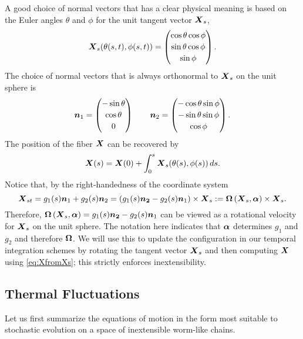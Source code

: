 A good choice of normal vectors that has a clear physical meaning is based on the Euler angles $\theta$ and $\phi$ for the unit tangent vector $\boldsymbol{X}_s$,
\begin{equation}
\boldsymbol{X}_s(\theta(s,t),\phi(s,t)) = \begin{pmatrix} \cos{\theta} \cos{\phi}\\[2 pt] \sin{\theta} \cos{\phi} \\[2 pt] \sin{\phi} \end{pmatrix}.
\end{equation}
The choice of normal vectors that is always orthonormal to $\boldsymbol{X}_s$ on the unit sphere is
\begin{equation}
\boldsymbol{n}_1 =  \begin{pmatrix} -\sin{\theta}\\[2 pt] \cos{\theta}\\[2 pt]0 \end{pmatrix} \qquad \boldsymbol{n}_2 =  \begin{pmatrix} -\cos{\theta} \sin{\phi}\\[2 pt] -\sin{\theta} \sin{\phi} \\[2 pt] \cos{\phi} \end{pmatrix}. 
\end{equation}
The position of the fiber $\boldsymbol{X}$ can be recovered by 
\begin{equation}
\label{eq:XfromXs}
\boldsymbol{X}(s)= \boldsymbol{X}(0)+\int_0^s \boldsymbol{X}_s(\theta(s),\phi(s)) \, ds. 
\end{equation}
Notice that, by the right-handedness of the coordinate system
\begin{equation}
\label{eq:Xsupdate}
\boldsymbol{X}_{st} = g_1(s)\boldsymbol{n}_1 + g_2(s) \boldsymbol{n}_2 = \left(g_1(s)\boldsymbol{n_2}-g_2(s)\boldsymbol{n}_1\right) \times \boldsymbol{X}_s:=\boldsymbol{\Omega}\left(\boldsymbol{X}_s, \boldsymbol{\alpha}\right) \times \boldsymbol{X}_s. 
\end{equation}
Therefore, $\boldsymbol{\Omega}\left(\boldsymbol{X}_s, \boldsymbol{\alpha}\right)=g_1(s)\boldsymbol{n_2}-g_2(s)\boldsymbol{n}_1$ can be viewed as a rotational velocity for $\boldsymbol{X}_s$ on the unit sphere. The notation here indicates that $\boldsymbol{\alpha}$ determines $g_1$ and $g_2$ and therefore $\boldsymbol{\Omega}$. We will use this to update the configuration in our temporal integration schemes by rotating the tangent vector $\boldsymbol{X}_s$ and then computing $\boldsymbol{X}$ using \eqref{eq:XfromXs}; this strictly enforces inextensibility.

\subsection{Thermal Fluctuations}

Let us first summarize the equations of motion in the form most suitable to stochastic evolution on a space of inextensible worm-like chains. 